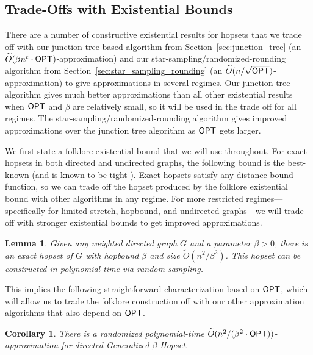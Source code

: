 \documentclass{article}
\newtheorem{corollary}[theorem]{Corollary}
\newtheorem{lemma}[theorem]{Lemma}
\theoremstyle{definition}
\theoremstyle{remark}
\def\be    {\beta}
\def\opt {{\sf OPT}}
\def\hopset {{\sc Generalized $\beta$-Hopset}}
\begin{document}
 
\subsection{Trade-Offs with Existential Bounds}\label{sec:existential}

There are a number of constructive existential results for hopsets that we trade off with our junction tree-based algorithm from Section~\ref{sec:junction_tree} (an $\widetilde{O}(\be n^\epsilon \cdot {\opt})$-approximation) and our star-sampling/randomized-rounding algorithm from Section~\ref{sec:star_sampling_rounding} (an $\widetilde{O}(n / \sqrt{\opt})$-approximation) to give approximations in several regimes. 
Our junction tree algorithm gives much better approximations than all other existential results when $\opt$ and $\beta$ are relatively small, so it will be used in the trade off for all regimes. The star-sampling/randomized-rounding algorithm gives improved approximations over the junction tree algorithm as ${\opt}$ gets larger. 

\iflong  
We first state a folklore existential bound that we will use throughout. For exact hopsets in both directed and undirected graphs, the following bound is the best-known (and is known to be tight \cite{BH23folklore}). Exact hopsets satisfy any distance bound function, so we can trade off the hopset produced by the folklore existential bound with other algorithms in any regime. For more restricted regimes---specifically for limited stretch, hopbound, and undirected graphs---we will trade off with stronger existential bounds to get improved approximations.

\begin{lemma}
    Given any weighted directed graph $G$ and a parameter $\beta >0$, there is an exact hopset of $G$ with hopbound $\beta$ and size $\widetilde{O}(n^2/\beta^2)$. This hopset can be constructed in polynomial time via random sampling.
\end{lemma}

This implies the following straightforward characterization based on $\opt$, which will allow us to trade the folklore construction off with our other approximation algorithms that also depend on $\opt$.

\begin{corollary} \label{cor:existential_folklore}
    There is a randomized polynomial-time $\widetilde{O}(n^2/ (\beta^2 \cdot \opt))$-approximation for directed {\hopset}.
\end{corollary}
\end{document}
